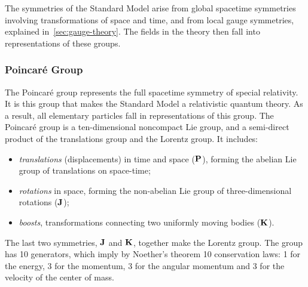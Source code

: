 The symmetries of the Standard Model arise from  global spacetime symmetries involving transformations of space and time, and from local gauge symmetries, explained in~\ref{sec:gauge-theory}. The fields in the theory then fall into representations of these groups.

\subsubsection{Poincaré Group}

The Poincaré group represents the full spacetime symmetry of special relativity. It is this group that makes the Standard Model a relativistic quantum theory. As a result, all elementary particles fall in representations of this group. The Poincaré group is a ten-dimensional noncompact Lie group, and a semi-direct product of the translations group and the Lorentz group. It includes:
\begin{itemize}
\item \emph{translations} (displacements) in time and space ($\vb{P}$), forming the abelian Lie group of translations on space-time;
\item \emph{rotations} in space, forming the non-abelian Lie group of three-dimensional rotations ($\vb{J}$);
\item \emph{boosts}, transformations connecting two uniformly moving bodies ($\vb{K}$).
\end{itemize}
The last two symmetries, $\vb{J}$ and $\vb{K}$, together make the Lorentz group. The group has 10 generators, which imply by Noether's theorem 10 conservation laws: 1 for the energy, 3 for the momentum, 3 for the angular momentum and 3 for the velocity of the center of mass.

